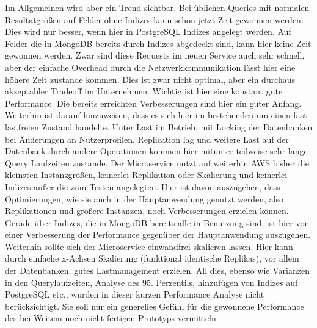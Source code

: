 Im Allgemeinen wird aber ein Trend sichtbar. Bei üblichen Queries mit normalen Resultatgrößen auf Felder ohne Indizes kann schon jetzt Zeit gewonnen werden. Dies wird nur besser, wenn hier in PostgreSQL Indizes angelegt werden. 
Auf Felder die in MongoDB bereits durch Indizes abgedeckt sind, kann hier keine Zeit gewonnen werden. Zwar sind diese Requests im neuen Service auch sehr schnell, aber der einfache Overhead durch die Netzwerkkommunikation lässt hier eine höhere Zeit zustande kommen.
Dies ist zwar nicht optimal, aber ein durchaus akzeptabler Tradeoff im Unternehmen. Wichtig ist hier eine konstant gute Performance. Die bereits erreichten Verbesserungen sind hier ein guter Anfang.
Weiterhin ist darauf hinzuweisen, dass es sich hier im bestehenden um einen fast lastfreien Zustand handelte. Unter Last im Betrieb, mit Locking der Datenbanken bei Änderungen an Nutzerprofilen, Replication lag und weitere Last auf der Datenbank durch andere Operationen kommen hier mitunter teilweise sehr lange Query Laufzeiten zustande. 
Der Microservice nutzt auf weiterhin AWS bisher die kleinsten Instanzgrößen, keinerlei Replikation oder Skalierung und keinerlei Indizes außer die zum Testen angelegten. 
Hier ist davon auszugehen, dass Optimierungen, wie sie auch in der Hauptanwendung genutzt werden, also Replikationen und größere Instanzen, noch Verbesserungen erzielen können. Gerade über Indizes, die in MongoDB bereits alle in Benutzung sind, ist hier von einer Verbesserung der Performance gegenüber der Hauptanwendung auszugehen. Weiterhin sollte sich der Microservice einwandfrei skalieren lassen. Hier kann durch einfache x-Achsen Skalierung (funktional identische Replikas), vor allem der Datenbanken, gutes Lastmanagement erzielen.
All dies, ebenso wie Varianzen in den Querylaufzeiten, Analyse des 95. Perzentils, hinzufügen von Indizes auf PostgreSQL etc., wurden in dieser kurzen Performance Analyse nicht berücksichtigt. Sie soll nur ein generelles Gefühl für die gewonnene Performance des bei Weitem noch nicht fertigen Prototyps vermitteln.